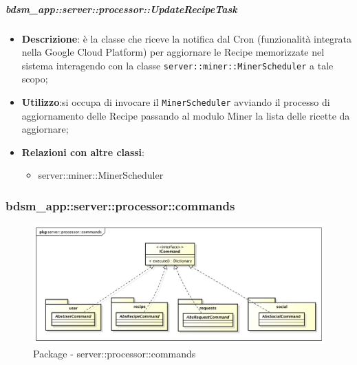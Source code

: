     \subparagraph{bdsm\_app::server::processor::UpdateRecipeTask} %
    \label{subp:bdsm_app_server_processor_updaterecipetask}
    \begin{itemize}
      \item \textbf{Descrizione}: è la classe che riceve la notifica dal Cron (funzionalità integrata nella Google Cloud Platform) per aggiornare le Recipe memorizzate nel sistema interagendo con la classe \texttt{server::miner::MinerScheduler} a tale scopo;
      \item \textbf{Utilizzo}:si occupa di invocare il \texttt{MinerScheduler} avviando il processo di aggiornamento delle Recipe passando al modulo Miner la lista delle ricette da aggiornare;
      \item \textbf{Relazioni con altre classi}:
        \begin{itemize}
          \item server::miner::MinerScheduler
        \end{itemize}
    \end{itemize}


    \subsubsection{bdsm\_app::server::processor::commands} %
    \label{ssub:bdsm_app_server_processor_commands}
    \begin{figure}[!htbp]
    	\centering
    	\centerline{\includegraphics[scale=0.4]{./images/server/commands.pdf}}
    	\caption{Package - server::processor::commands}
    \end{figure}


